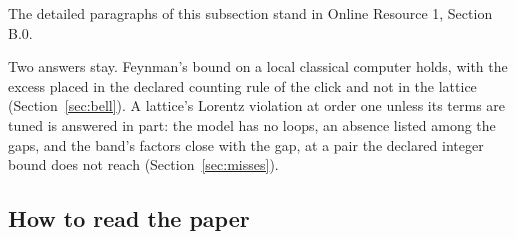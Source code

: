 \documentclass[pdflatex,sn-mathphys-num]{sn-jnl}
\theoremstyle{thmstyleone}
\theoremstyle{thmstyletwo}
\begin{document}
The detailed paragraphs of this subsection stand in Online Resource 1, Section B.0.

Two answers stay. Feynman's bound on a local classical computer \cite{feynman} holds, with the excess placed in the declared counting rule of the click and not in the lattice (Section~\ref{sec:bell}). A lattice's Lorentz violation at order one unless its terms are tuned \cite{collins}\cite{mattingly} is answered in part: the model has no loops, an absence listed among the gaps, and the band's factors close with the gap, at a pair the declared integer bound does not reach (Section~\ref{sec:misses}).

\subsection{How to read the paper}\label{sec:key}
\end{document}
